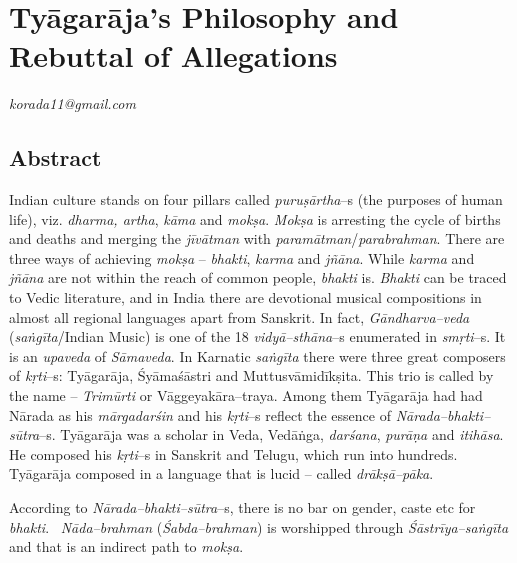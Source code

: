 
\chapter{Tyāgarāja’s Philosophy and Rebuttal of Allegations}\label{chapter3}


\begin{flushright}
\textit{korada11@gmail.com}
\end{flushright}


\section*{Abstract}

Indian culture stands on four pillars called \textit{puruṣārtha}–s (the purposes of human life), viz. \textit{dharma, artha}, \textit{kāma} and \textit{mokṣa}. \textit{Mokṣa} is arresting the cycle of births and deaths and merging the \textit{jīvātman} with \textit{paramātman}/\textit{parabrahman}. There are three ways of achieving \textit{mokṣa} – \textit{bhakti}, \textit{karma} and \textit{jñāna}. While \textit{karma} and \textit{jñāna} are not within the reach of common people, \textit{bhakti} is. \textit{Bhakti} can be traced to Vedic literature, and in India there are devotional musical compositions in almost all regional languages apart from Sanskrit. In fact, \textit{Gāndharva–veda} (\textit{saṅgīta}/Indian Music) is one of the 18 \textit{vidyā–sthāna}–s enumerated in \textit{smṛti}–s. It is an \textit{upaveda} of \textit{Sāmaveda}. In Karnatic \textit{saṅgīta} there were three great composers of \textit{kṛti}–s: Tyāgarāja, Śyāmaśāstri and Muttusvāmidīkṣita. This trio is called by the name – \textit{Trimūrti} or Vāggeyakāra–traya. Among them Tyāgarāja had had Nārada as his \textit{mārgadarśin} and his \textit{kṛti}–s reflect the essence of \textit{Nārada–bhakti–sūtra}–s. Tyāgarāja was a scholar in Veda, Vedāṅga, \textit{darśana}, \textit{purāṇa} and \textit{itihāsa}. He composed his \textit{kṛti}–s in Sanskrit and Telugu, which run into hundreds. Tyāgarāja composed in a language that is lucid – called \textit{drākṣā–pāka}. 

According to \textit{Nārada–bhakti–sūtra}–s, there is no bar on gender, caste etc for \textit{bhakti}.  \textit{Nāda–brahman} (\textit{Śabda–brahman}) is worshipped through \textit{Śāstrīya–saṅgīta} and that is an indirect path to \textit{mokṣa}. 

